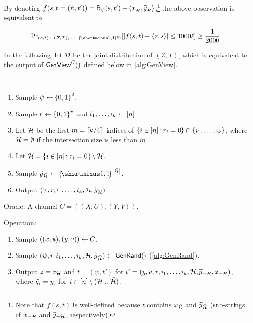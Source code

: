 By denoting $f(s,t=(\psi,t')) = \mathsf{B}_{\psi}(s,t') + \langle x_{\bar{{\cal H}}}, \widetilde{y}_{\bar{{\cal H}}} \rangle$,\footnote{Note that $f(s,t)$ is well-defined because $t$ contains $x_{\bar{{\cal H}}}$ and $\widetilde{y}_{\bar{{\cal H}}}$ (sub-strings of $x_{-{\cal H}}$ and $\widetilde{y}_{-{\cal H}}$, respectively).} the above observation is equivalent to

\begin{align}\label{eq:our-good-f}
	\ppr{(z,t) \la (Z,T), \: s \la \oo^m}{\size{f(s,t) - \ip{z, s}} \leq 1000 \ell} \geq \frac1{2000}.
\end{align}

In the following, let ${\cal D}$ be the joint distribution of $(Z,T)$, which is equivalent to the output of $\mathsf{GenView}^{C}()$ defined below in \cref{alg:GenView}.

\begin{algorithm}[$\GenRand$]\label{alg:GenRand}
	~
	\begin{enumerate}
            \item Sample $\psi \la \zo^d$.
		\item Sample $r \la \zo^n$ and $i_1,\ldots,i_k \gets [n]$.
		\item Let ${\cal H}$ be the first $m=\ceil{k/4}$ indices of $\set{i \in [n] \colon r_i = 0} \cap  \set{i_1,\ldots,i_k}$, where ${\cal H} = \emptyset$ if the intersection size is less than $m$.
		\item Let $\bar{\cH} = \set{i \in [n] \colon r_i = 0} \setminus \cH$.
		\item Sample $\ty_{\bar{\cH}} \la \oo^{\size{\bar{\cH}}}$.
		\item Output $(\psi,r,i_1,\ldots,i_k,{\cal H},\widetilde{y}_{\bar{{\cal H}}})$.
	\end{enumerate}
\end{algorithm}



\begin{algorithm}[$\GenView$]\label{alg:GenView}
	\item Oracle: A channel $C = ((X,U),(Y,V))$.
	\item Operation:~
	\begin{enumerate}
		\item Sample $((x,u),(y,v)) \gets C$.
		\item Sample $(\psi,r,i_1,\ldots,i_k,{\cal H},\widetilde{y}_{\bar{{\cal H}}}) \gets \mathsf{GenRand}()$ (\cref{alg:GenRand}).
		\item Output $z = x_{{\cal H}}$ and $t = (\psi, t')$ for $t'=(y,v,r,i_1,\ldots,i_k,{\cal H},\widetilde{y}_{-{\cal H}},x_{-{\cal H}})$, where $\widetilde{y}_i = y_i$ for $i \in [n]\setminus ({\cal H} \cup \bar{{\cal H}})$.
	\end{enumerate}
\end{algorithm}



